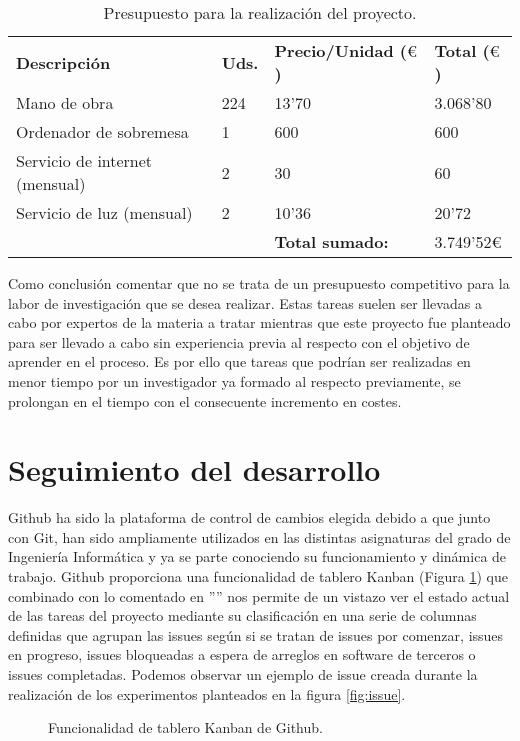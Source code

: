 \begin{table}[H]
    \begin{tabular}{llll}
    \rowcolor[HTML]{C0C0C0} 
    \textbf{Descripción}           & \textbf{Uds.} & \textbf{Precio/Unidad ($\euro$)} & \textbf{Total ($\euro$)} \\
    Mano de obra                   & 224           & 13'70                  & 3.068'80               \\
    Ordenador de sobremesa         & 1             & 600                    & 600                    \\
    Servicio de internet (mensual) & 2             & 30                     & 60                     \\
    Servicio de luz (mensual)      & 2             & 10'36                  & 20'72                  \\\hline
                                   &               & \textbf{Total sumado:} & 3.749'52$\euro$              
    \end{tabular}
    \caption{Presupuesto para la realización del proyecto.}
    \label{table:presupuesto}
\end{table}

Como conclusión comentar que no se trata de un presupuesto competitivo para la labor de investigación que se desea realizar. Estas tareas suelen 
ser llevadas a cabo por expertos de la materia a tratar mientras que este proyecto fue planteado para ser llevado a cabo sin experiencia previa al 
respecto con el objetivo de aprender en el proceso. Es por ello que tareas que podrían ser realizadas en menor tiempo por un investigador ya formado al respecto previamente, se prolongan 
en el tiempo con el consecuente incremento en costes.

\section{Seguimiento del desarrollo}
\label{seguimiento}
Github ha sido la plataforma de control de cambios elegida debido a que junto con Git, han sido ampliamente utilizados
en las distintas asignaturas del grado de Ingeniería Informática y ya se parte conociendo su funcionamiento y dinámica de 
trabajo. Github proporciona una funcionalidad de tablero Kanban (Figura \ref{fig:kanban}) que combinado con lo comentado en ''''
nos permite de un vistazo ver el estado actual de las tareas del proyecto mediante su clasificación en una serie de columnas 
definidas que agrupan las issues según si se tratan de issues por comenzar, issues en progreso, issues bloqueadas a espera 
de arreglos en software de terceros o issues completadas. Podemos observar un ejemplo de issue creada durante la realización de los 
experimentos planteados en la figura \ref{fig:issue}.
\begin{figure}[H]
    \caption{Funcionalidad de tablero Kanban de Github.}
    \label{fig:kanban}
\end{figure}

